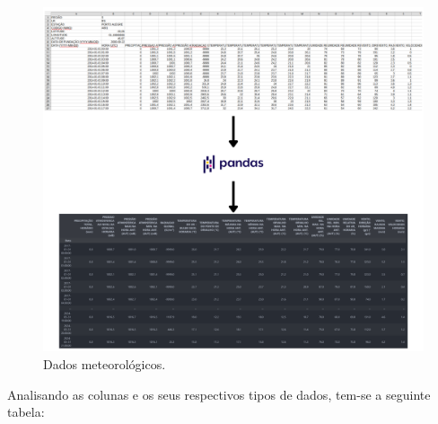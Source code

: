 \begin{figure}[H]
	\caption{\label{fig:base_inmet}Dados meteorológicos.}
	\begin{center}
		\includegraphics[scale=0.25]{figuras/base_inmet.png}
	\end{center}
\end{figure}
\pagebreak
Analisando as colunas e os seus respectivos tipos de dados, tem-se a seguinte tabela:


